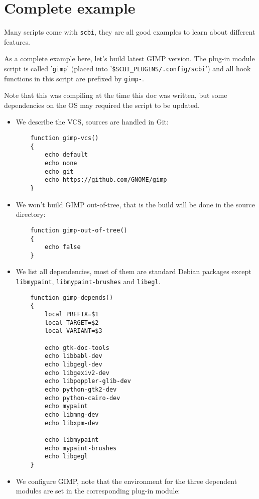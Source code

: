 \documentclass[a4paper,12pt,twoside]{article}
\newcommand{\code}[1]{\texttt{#1}}
\newcommand{\file}[1]{'{\texttt{#1}}'}
\let\stdsection\section
\renewcommand\section{\newpage\stdsection}
\begin{document}
\section{Complete example}

Many scripts come with \code{scbi}, they are all good examples to learn about different features.

As a complete example here, let's build latest GIMP version. The plug-in module script is called \file{gimp} (placed into \file{\$SCBI\_PLUGINS/.config/scbi}) and all hook functions in this script are prefixed by \code{gimp-}.

Note that this was compiling at the time this doc was written, but some dependencies on the OS may required the script to be updated.

\begin{itemize}
	\item We describe the VCS, sources are handled in Git:

	\begin{lstlisting}
	function gimp-vcs()
	{
		echo default
		echo none
		echo git
		echo https://github.com/GNOME/gimp
	}
	\end{lstlisting}

	\item We won't build GIMP out-of-tree, that is the build will be done in the source directory:

	\begin{lstlisting}
	function gimp-out-of-tree()
	{
		echo false
	}
	\end{lstlisting}

	\item We list all dependencies, most of them are standard Debian packages except \code{libmypaint}, \code{libmypaint-brushes} and \code{libegl}.

	\begin{lstlisting}
	function gimp-depends()
	{
		local PREFIX=$1
		local TARGET=$2
		local VARIANT=$3

		echo gtk-doc-tools
		echo libbabl-dev
		echo libgegl-dev
		echo libgexiv2-dev
		echo libpoppler-glib-dev
		echo python-gtk2-dev
		echo python-cairo-dev
		echo mypaint
		echo libmng-dev
		echo libxpm-dev

		echo libmypaint
		echo mypaint-brushes
		echo libgegl
	}
	\end{lstlisting}

	\item We configure GIMP, note that the environment for the three dependent modules are set in the corresponding plug-in module:


\end{itemize}
\end{document}
